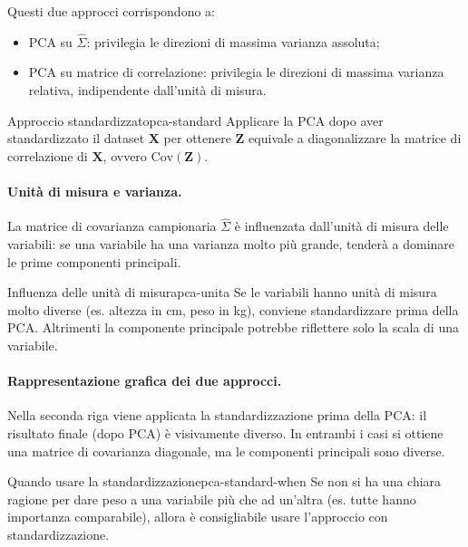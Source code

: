 Questi due approcci corrispondono a:

\begin{itemize}
  \item PCA su \(\hat{\Sigma}\): privilegia le direzioni di massima varianza
  assoluta;
  \item PCA su matrice di correlazione: privilegia le direzioni di massima
  varianza relativa, indipendente dall'unità di misura.
\end{itemize}

\begin{nota}{Approccio standardizzato}{pca-standard}
Applicare la PCA dopo aver standardizzato il dataset \(\mathbf{X}\) per ottenere
\(\mathbf{Z}\) equivale a diagonalizzare la matrice di correlazione di
\(\mathbf{X}\), ovvero \(\mathrm{Cov}(\mathbf{Z})\).
\end{nota}

\paragraph{Unità di misura e varianza.}
La matrice di covarianza campionaria \(\hat{\Sigma}\) è influenzata
dall’unità di misura delle variabili: se una variabile ha una varianza molto
più grande, tenderà a dominare le prime componenti principali.

\begin{nota}{Influenza delle unità di misura}{pca-unita}
Se le variabili hanno unità di misura molto diverse (es. altezza in cm, peso in
kg), conviene standardizzare prima della PCA. Altrimenti la componente
principale potrebbe riflettere solo la scala di una variabile.
\end{nota}

\paragraph{Rappresentazione grafica dei due approcci.}

Nella seconda riga viene applicata la standardizzazione prima della PCA: il
risultato finale (dopo PCA) è visivamente diverso. In entrambi i casi si
ottiene una matrice di covarianza diagonale, ma le componenti principali sono
diverse.

\begin{nota}{Quando usare la standardizzazione}{pca-standard-when}
Se non si ha una chiara ragione per dare peso a una variabile più che ad
un'altra (es. tutte hanno importanza comparabile), allora è consigliabile usare
l'approccio con standardizzazione.
\end{nota}



